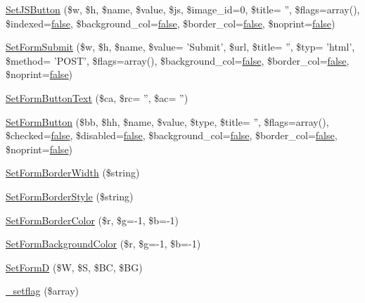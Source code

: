 \begin{DoxyCompactItemize}
\hyperlink{classform_add1adc49ec27660166b1657f4fde3e8f}{Set\-J\-S\-Button} (\$w, \$h, \$name, \$value, \$js, \$image\-\_\-id=0, \$title= '', \$flags=array(), \$indexed=\hyperlink{ttfontsuni_8php_afbaa04e5cc97693dc668b3c45d3dd740}{false}, \$background\-\_\-col=\hyperlink{ttfontsuni_8php_afbaa04e5cc97693dc668b3c45d3dd740}{false}, \$border\-\_\-col=\hyperlink{ttfontsuni_8php_afbaa04e5cc97693dc668b3c45d3dd740}{false}, \$noprint=\hyperlink{ttfontsuni_8php_afbaa04e5cc97693dc668b3c45d3dd740}{false})
\item 
\hyperlink{classform_a37e90b21ac1bad1337a18bda42c66511}{Set\-Form\-Submit} (\$w, \$h, \$name, \$value= 'Submit', \$url, \$title= '', \$typ= 'html', \$method= 'P\-O\-S\-T', \$flags=array(), \$background\-\_\-col=\hyperlink{ttfontsuni_8php_afbaa04e5cc97693dc668b3c45d3dd740}{false}, \$border\-\_\-col=\hyperlink{ttfontsuni_8php_afbaa04e5cc97693dc668b3c45d3dd740}{false}, \$noprint=\hyperlink{ttfontsuni_8php_afbaa04e5cc97693dc668b3c45d3dd740}{false})
\item 
\hyperlink{classform_afd30ad83495e7e16eea6e38d8828d7f1}{Set\-Form\-Button\-Text} (\$ca, \$rc= '', \$ac= '')
\item 
\hyperlink{classform_aac79089866b74936afe6f663fdb3490a}{Set\-Form\-Button} (\$bb, \$hh, \$name, \$value, \$type, \$title= '', \$flags=array(), \$checked=\hyperlink{ttfontsuni_8php_afbaa04e5cc97693dc668b3c45d3dd740}{false}, \$disabled=\hyperlink{ttfontsuni_8php_afbaa04e5cc97693dc668b3c45d3dd740}{false}, \$background\-\_\-col=\hyperlink{ttfontsuni_8php_afbaa04e5cc97693dc668b3c45d3dd740}{false}, \$border\-\_\-col=\hyperlink{ttfontsuni_8php_afbaa04e5cc97693dc668b3c45d3dd740}{false}, \$noprint=\hyperlink{ttfontsuni_8php_afbaa04e5cc97693dc668b3c45d3dd740}{false})
\item 
\hyperlink{classform_ac316dbca5a3fee5e0c4bd8afbf777786}{Set\-Form\-Border\-Width} (\$string)
\item 
\hyperlink{classform_aa596835a361c1063d37fe8faa913cc2f}{Set\-Form\-Border\-Style} (\$string)
\item 
\hyperlink{classform_a48b55c11cca11107e8af5c81fd181018}{Set\-Form\-Border\-Color} (\$r, \$g=-\/1, \$b=-\/1)
\item 
\hyperlink{classform_a4685a4f5963ecc3f61f8e90df0ec8ae9}{Set\-Form\-Background\-Color} (\$r, \$g=-\/1, \$b=-\/1)
\item 
\hyperlink{classform_a5377203371b80aa4e9ce7feaa83ea293}{Set\-Form\-D} (\$W, \$S, \$B\-C, \$B\-G)
\item 
\hyperlink{classform_ab2ec8483029ca2fb7dd06a739fae2589}{\-\_\-setflag} (\$array)

\end{DoxyCompactItemize}
